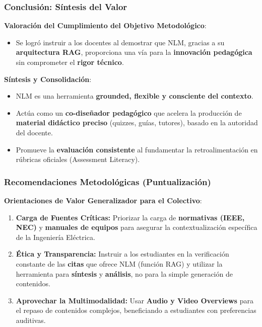 \documentclass[aspectratio=43]{beamer}
\begin{document}

\begin{frame}
\frametitle{ Conclusión: Síntesis del Valor}

\textbf{Valoración del Cumplimiento del Objetivo Metodológico}:
\begin{itemize}
    \item Se logró instruir a los docentes al demostrar que NLM, gracias a su \textbf{arquitectura RAG}, proporciona una vía para la \textbf{innovación pedagógica} sin comprometer el \textbf{rigor técnico}.
\end{itemize}

\textbf{Síntesis y Consolidación}:
\begin{itemize}
    \item NLM es una herramienta \textbf{grounded, flexible y consciente del contexto}.
    \item Actúa como un \textbf{co-diseñador pedagógico} que acelera la producción de \textbf{material didáctico preciso} (quizzes, guías, tutores), basado en la autoridad del docente.
    \item Promueve la \textbf{evaluación consistente} al fundamentar la retroalimentación en rúbricas oficiales (Assessment Literacy).
\end{itemize}
\end{frame}

\begin{frame}
\frametitle{ Recomendaciones Metodológicas (Puntualización)}

\textbf{Orientaciones de Valor Generalizador para el Colectivo}:
\begin{enumerate}
    \item \textbf{Carga de Fuentes Críticas:} Priorizar la carga de \textbf{normativas (IEEE, NEC)} y \textbf{manuales de equipos} para asegurar la contextualización específica de la Ingeniería Eléctrica.
    \item \textbf{Ética y Transparencia:} Instruir a los estudiantes en la verificación constante de las \textbf{citas} que ofrece NLM (función RAG) y utilizar la herramienta para \textbf{síntesis} y \textbf{análisis}, no para la simple generación de contenidos.
    \item \textbf{Aprovechar la Multimodalidad:} Usar \textbf{Audio y Video Overviews} para el repaso de contenidos complejos, beneficiando a estudiantes con preferencias auditivas.
\end{enumerate}
\end{frame}
\end{document}
